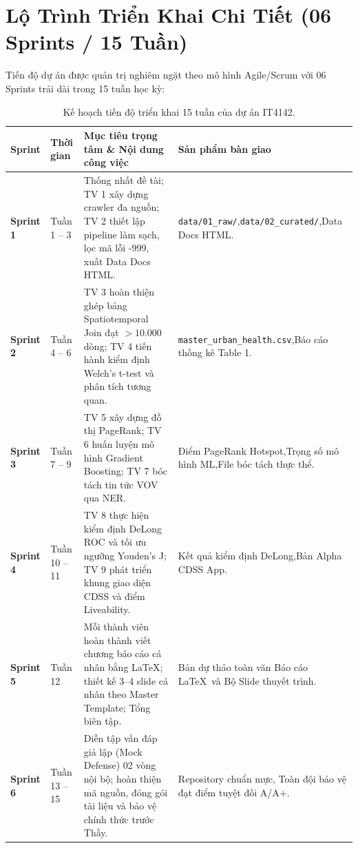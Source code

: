 \documentclass[11pt,a4paper]{article}
\begin{document}
\section{Lộ Trình Triển Khai Chi Tiết (06 Sprints / 15 Tuần)}

Tiến độ dự án được quản trị nghiêm ngặt theo mô hình Agile/Scrum với 06 Sprints trải dài trong 15 tuần học kỳ:

\begin{table}[htbp]
\centering
\small
\renewcommand{\arraystretch}{1.3}
\caption{Kế hoạch tiến độ triển khai 15 tuần của dự án IT4142.}
\label{tab:sprint_plan}
\begin{tabularx}{\textwidth}{>{\centering\arraybackslash}p{1.6cm} >{\centering\arraybackslash}p{2.0cm} >{\raggedright\arraybackslash}X >{\raggedright\arraybackslash}p{4.6cm}}
\toprule
\textbf{Sprint} & \textbf{Thời gian} & \textbf{Mục tiêu trọng tâm \& Nội dung công việc} & \textbf{Sản phẩm bàn giao} \\
\midrule
\textbf{Sprint 1} & Tuần 1 -- 3 & Thống nhất đề tài; TV 1 xây dựng crawler đa nguồn; TV 2 thiết lập pipeline làm sạch, lọc mã lỗi -999, xuất Data Docs HTML. & \texttt{data/01\_raw/},\newline \texttt{data/02\_curated/},\newline Data Docs HTML. \\
\textbf{Sprint 2} & Tuần 4 -- 6 & TV 3 hoàn thiện ghép bảng Spatiotemporal Join đạt $>10.000$ dòng; TV 4 tiến hành kiểm định Welch's t-test và phân tích tương quan. & \texttt{master\_urban\_health.csv},\newline Báo cáo thống kê Table 1. \\
\textbf{Sprint 3} & Tuần 7 -- 9 & TV 5 xây dựng đồ thị PageRank; TV 6 huấn luyện mô hình Gradient Boosting; TV 7 bóc tách tin tức VOV qua NER. & Điểm PageRank Hotspot,\newline Trọng số mô hình ML,\newline File bóc tách thực thể. \\
\textbf{Sprint 4} & Tuần 10 -- 11 & TV 8 thực hiện kiểm định DeLong ROC và tối ưu ngưỡng Youden's J; TV 9 phát triển khung giao diện CDSS và điểm Liveability. & Kết quả kiểm định DeLong,\newline Bản Alpha CDSS App. \\
\textbf{Sprint 5} & Tuần 12 & Mỗi thành viên hoàn thành viết chương báo cáo cá nhân bằng \LaTeX; thiết kế 3--4 slide cá nhân theo Master Template; Tổng biên tập. & Bản dự thảo toàn văn Báo cáo \LaTeX\ và Bộ Slide thuyết trình. \\
\textbf{Sprint 6} & Tuần 13 -- 15 & Diễn tập vấn đáp giả lập (Mock Defense) 02 vòng nội bộ; hoàn thiện mã nguồn, đóng gói tài liệu và bảo vệ chính thức trước Thầy. & Repository chuẩn mực, Toàn đội bảo vệ đạt điểm tuyệt đối A/A+. \\
\bottomrule
\end{tabularx}
\end{table}
\end{document}

